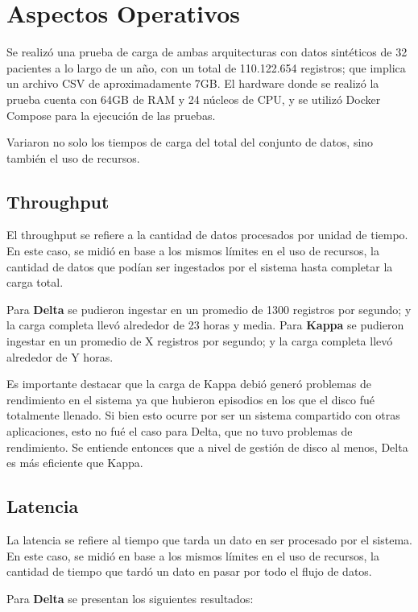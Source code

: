 \section{Aspectos Operativos}

Se realizó una prueba de carga de ambas arquitecturas con datos sintéticos de 32 pacientes a lo largo de un año, con un total de 110.122.654 registros; 
que implica un archivo CSV de aproximadamente 7GB.
El hardware donde se realizó la prueba cuenta con 64GB de RAM y 24 núcleos de CPU, y se utilizó Docker Compose para la ejecución de las pruebas.

Variaron no solo los tiempos de carga del total del conjunto de datos, sino también el uso de recursos.


\subsection{Throughput}
El throughput se refiere a la cantidad de datos procesados por unidad de tiempo.
En este caso, se midió en base a los mismos límites en el uso de recursos, la cantidad de datos que podían ser ingestados por el sistema hasta completar la carga total.

Para \textbf{Delta} se pudieron ingestar en un promedio de 1300 registros por segundo; y la carga completa llevó alrededor de 23 horas y media.
Para \textbf{Kappa} se pudieron ingestar en un promedio de X registros por segundo; y la carga completa llevó alrededor de Y horas.

Es importante destacar que la carga de Kappa debió generó problemas de rendimiento en el sistema ya que hubieron episodios en los que el disco fué totalmente llenado. 
Si bien esto ocurre por ser un sistema compartido con otras aplicaciones, esto no fué el caso para Delta, que no tuvo problemas de rendimiento.
Se entiende entonces que a nivel de gestión de disco al menos, Delta es más eficiente que Kappa. 

\subsection{Latencia}

La latencia se refiere al tiempo que tarda un dato en ser procesado por el sistema.
En este caso, se midió en base a los mismos límites en el uso de recursos, la cantidad de tiempo que tardó un dato en pasar por todo el flujo de datos.

Para \textbf{Delta} se presentan los siguientes resultados: 

